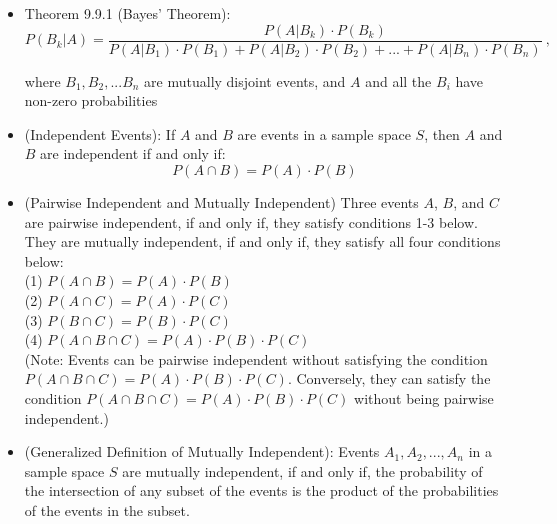 \documentclass{article}
\begin{document}
\begin{itemize}
        \\ \hspace*{3mm} (1) $P(B|A)=\frac{P(A\cap B)}{P(A)}$
        \\ \hspace*{3mm} (2) $P(A\cap B)=P(B|A)\cdot P(A)$
        \\ \hspace*{3mm} (3) $P(A)=\frac{P(A\cap B)}{P(B|A)}$
    \item Theorem 9.9.1 (Bayes' Theorem):
        \begin{equation*}
            P(B_k|A) = \frac{P(A|B_k)\cdot P(B_k)}
            {P(A|B_1)\cdot P(B_1)+P(A|B_2)\cdot P(B_2)+...+P(A|B_n)\cdot P(B_n)}\ ,
        \end{equation*}
        \begin{center}
            where $B_1, B_2,...B_n$ are mutually disjoint events, and $A$ and all the $B_i$ have non-zero probabilities
        \end{center}
    \item (Independent Events): If $A$ and $B$ are events in a sample space $S$, then $A$ and $B$ are independent if and only if:
        \begin{equation*}
            P(A\cap B)=P(A)\cdot P(B)
        \end{equation*}
    \item (Pairwise Independent and Mutually Independent) Three events $A$, $B$, and $C$ are pairwise independent, if and only if, they satisfy conditions 1-3 below. They are mutually independent, if and only if, they satisfy all four conditions below:
        \smallskip
        \\ \hspace*{3mm} (1) $P(A\cap B)=P(A)\cdot P(B)$
        \\ \hspace*{3mm} (2) $P(A\cap C)=P(A)\cdot P(C)$
        \\ \hspace*{3mm} (3) $P(B\cap C)=P(B)\cdot P(C)$
        \\ \hspace*{3mm} (4) $P(A\cap B\cap C)=P(A)\cdot P(B)\cdot P(C)$
        \smallskip
        \\ (Note: Events can be pairwise independent without satisfying the condition $P(A\cap B\cap C)=P(A)\cdot P(B)\cdot P(C)$. Conversely, they can satisfy the condition $P(A\cap B\cap C)=P(A)\cdot P(B)\cdot P(C)$ without being pairwise independent.)
    \item (Generalized Definition of Mutually Independent): Events $A_1, A_2,...,A_n$ in a sample space $S$ are mutually independent, if and only if, the probability of the intersection of any subset of the events is the product of the probabilities of the events in the subset.
\end{itemize}
\end{document}
